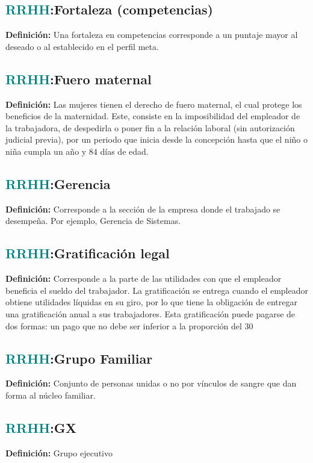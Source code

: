 \documentclass[12pt]{article}
\begin{document}
\subsection{\textcolor{teal}{RRHH}:{Fortaleza (competencias)}}
\textbf{Definición:} Una fortaleza en competencias corresponde a un puntaje mayor al deseado o al establecido en el perfil meta.

\subsection{\textcolor{teal}{RRHH}:{Fuero maternal}}
\textbf{Definición:} Las mujeres tienen el derecho de fuero maternal, el cual protege los beneficios de la maternidad. Este, consiste en la imposibilidad del empleador de la trabajadora, de despedirla o poner fin a la relación laboral (sin autorización judicial previa), por un periodo que inicia desde la concepción hasta que el niño o niña cumpla un año y 84 días de edad.
\subsection{\textcolor{teal}{RRHH}:{Gerencia}}
\textbf{Definición:} Corresponde a la sección de la empresa donde el trabajado se desempeña. Por ejemplo, Gerencia de Sistemas.
\subsection{\textcolor{teal}{RRHH}:{Gratificación legal}}
\textbf{Definición:} Corresponde a la parte de las utilidades con que el empleador beneficia el sueldo del trabajador.
La gratificación se entrega cuando el empleador obtiene utilidades líquidas en su giro, por lo que tiene la obligación de entregar una gratificación anual a sus trabajadores. Esta gratificación puede pagarse de dos formas: un pago que no debe ser inferior a la proporción del 30%

\subsection{\textcolor{teal}{RRHH}:{Grupo Familiar}}
\textbf{Definición:} Conjunto de personas unidas o no por vínculos de sangre que dan forma al núcleo familiar.
\subsection{\textcolor{teal}{RRHH}:{GX}}
\textbf{Definición:} Grupo ejecutivo
\end{document}
